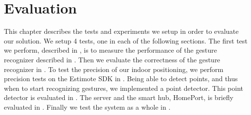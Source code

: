 \chapter{Evaluation}\label{chap:evaluation}
This chapter describes the tests and experiments we setup in order to evaluate our solution. 
We setup \num{4} tests, one in each of the following sections. 
The first test we perform, described in ,
is to measure the performance of the gesture recognizer described in . 
Then we evaluate the correctness of the gesture recognizer in .
To test the precision of our indoor positioning, 
we perform precision tests on the Estimote SDK in .
Being able to detect points, and thus when to start recognizing gestures, we implemented a point detector. 
This point detector is evaluated in .
The server and the smart hub, HomePort, is briefly evaluated in .
Finally we test the system as a whole in .






